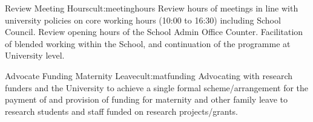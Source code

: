 \newcommand{\actcultmeetinghours}{Review hours of meetings in line with university policies on core working hours (10:00 to 16:30) including School Council. Review opening hours of the School Admin Office Counter. Facilitation of blended working within the School, and continuation of the programme at University level.}
\begin{actionblock}{\ksspace{}Review Meeting Hours}{cult:meetinghours}
\actcultmeetinghours
\hfill{
    \hypersetup{hidelinks}
    \hyperlink{e2}{\gotoactionsymbol{}}
}
\end{actionblock}





\newcommand{\actcultmatfunding}{Advocating with research funders and the University to achieve a single formal scheme/arrangement for the payment of and provision of funding for maternity and other family leave to research students and staff funded on research projects/grants.}
\begin{actionblock}{\ksspace{}Advocate Funding Maternity Leave}{cult:matfunding}
\actcultmatfunding
\hfill{
    \hypersetup{hidelinks}
    \hyperlink{e5}{\gotoactionsymbol{}}
}
\end{actionblock}

